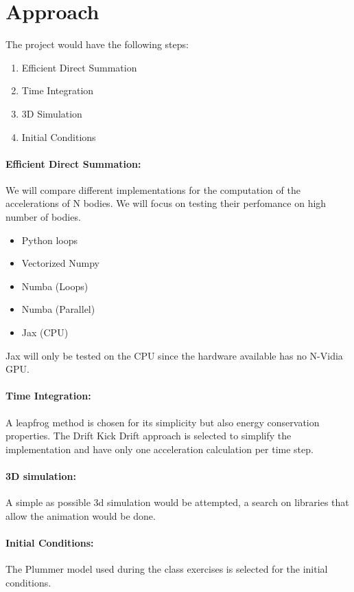 \documentclass[a4paper, 11pt]{article}         %
\begin{document}
\section{Approach}                              %
The project would have the following steps:
\begin{enumerate}
    \item Efficient Direct Summation
    \item Time Integration
    \item 3D Simulation
    \item Initial Conditions
\end{enumerate}


\paragraph{Efficient Direct Summation:}
We will compare different implementations for the computation of the accelerations of N bodies.
We will focus on testing their perfomance on high number of bodies.

\begin{itemize}
    \item Python loops
    \item Vectorized Numpy
    \item Numba (Loops)
    \item Numba (Parallel)
    \item Jax (CPU)
\end{itemize}

Jax will only be tested on the CPU since the hardware available has no N-Vidia GPU.

\paragraph{Time Integration:}
A leapfrog method is chosen for its simplicity but also energy conservation properties.
The Drift Kick Drift approach is selected to simplify the implementation and have only one acceleration calculation per time step.


\paragraph{3D simulation:}
A simple as possible 3d simulation would be attempted, a search on libraries that allow the animation would be done.

\paragraph{Initial Conditions:}
The Plummer model used during the class exercises is selected for the initial conditions.
\end{document}
